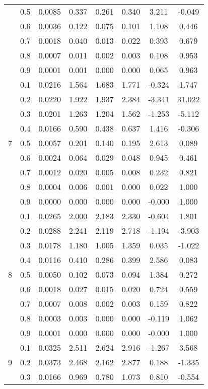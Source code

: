 \documentclass[11pt,a4paper]{report}
\begin{document}
\begin{longtable}{ | c | c || c | c | c | c | c | c | }
 & 0.5 & 0.0085 & 0.337 & 0.261 & 0.340 & 3.211 & -0.049 \\
 & 0.6 & 0.0036 & 0.122 & 0.075 & 0.101 & 1.108 & 0.446 \\
 & 0.7 & 0.0018 & 0.040 & 0.013 & 0.022 & 0.393 & 0.679 \\
 & 0.8 & 0.0007 & 0.011 & 0.002 & 0.003 & 0.108 & 0.953 \\
 & 0.9 & 0.0001 & 0.001 & 0.000 & 0.000 & 0.065 & 0.963 \\
 \hline
\multirow{9}{*}{7} & 0.1 & 0.0216 & 1.564 & 1.683 & 1.771 & -0.324 & 1.747 \\
 & 0.2 & 0.0220 & 1.922 & 1.937 & 2.384 & -3.341 & 31.022 \\
 & 0.3 & 0.0201 & 1.263 & 1.204 & 1.562 & -1.253 & -5.112 \\
 & 0.4 & 0.0166 & 0.590 & 0.438 & 0.637 & 1.416 & -0.306 \\
 & 0.5 & 0.0057 & 0.201 & 0.140 & 0.195 & 2.613 & 0.089 \\
 & 0.6 & 0.0024 & 0.064 & 0.029 & 0.048 & 0.945 & 0.461 \\
 & 0.7 & 0.0012 & 0.020 & 0.005 & 0.008 & 0.232 & 0.821 \\
 & 0.8 & 0.0004 & 0.006 & 0.001 & 0.000 & 0.022 & 1.000 \\
 & 0.9 & 0.0000 & 0.000 & 0.000 & 0.000 & -0.000 & 1.000 \\
 \hline
\multirow{9}{*}{8} & 0.1 & 0.0265 & 2.000 & 2.183 & 2.330 & -0.604 & 1.801 \\
 & 0.2 & 0.0288 & 2.241 & 2.119 & 2.718 & -1.194 & -3.903 \\
 & 0.3 & 0.0178 & 1.180 & 1.005 & 1.359 & 0.035 & -1.022 \\
 & 0.4 & 0.0116 & 0.410 & 0.286 & 0.399 & 2.586 & 0.083 \\
 & 0.5 & 0.0050 & 0.102 & 0.073 & 0.094 & 1.384 & 0.272 \\
 & 0.6 & 0.0018 & 0.027 & 0.015 & 0.020 & 0.724 & 0.559 \\
 & 0.7 & 0.0007 & 0.008 & 0.002 & 0.003 & 0.159 & 0.822 \\
 & 0.8 & 0.0003 & 0.003 & 0.000 & 0.000 & -0.119 & 1.062 \\
 & 0.9 & 0.0001 & 0.000 & 0.000 & 0.000 & -0.000 & 1.000 \\
 \hline
\multirow{9}{*}{9} & 0.1 & 0.0325 & 2.511 & 2.624 & 2.916 & -1.267 & 3.568 \\
 & 0.2 & 0.0373 & 2.468 & 2.162 & 2.877 & 0.188 & -1.335 \\
 & 0.3 & 0.0166 & 0.969 & 0.780 & 1.073 & 0.810 & -0.554 \\

\end{longtable}
\end{document}
